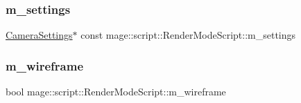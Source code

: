 \hypertarget{classmage_1_1script_1_1_render_mode_script_a01e58c5b50ba1cfc72c215ed98591a1a}{}\label{classmage_1_1script_1_1_render_mode_script_a01e58c5b50ba1cfc72c215ed98591a1a} 
\subsubsection{\texorpdfstring{m\+\_\+settings}{m\_settings}}
{\footnotesize\ttfamily \hyperlink{classmage_1_1_camera_settings}{Camera\+Settings}$\ast$ const mage\+::script\+::\+Render\+Mode\+Script\+::m\+\_\+settings\hspace{0.3cm}{\ttfamily [private]}}

\hypertarget{classmage_1_1script_1_1_render_mode_script_ae17378247a58b28f218085211521d8bd}{}\label{classmage_1_1script_1_1_render_mode_script_ae17378247a58b28f218085211521d8bd} 
\subsubsection{\texorpdfstring{m\+\_\+wireframe}{m\_wireframe}}
{\footnotesize\ttfamily bool mage\+::script\+::\+Render\+Mode\+Script\+::m\+\_\+wireframe\hspace{0.3cm}{\ttfamily [private]}}

